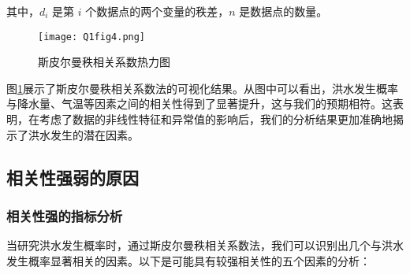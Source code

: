 \documentclass[withoutpreface,bwprint]{cumcmthesis} %
\begin{document}
其中，\(d_i\) 是第 \(i\) 个数据点的两个变量的秩差，\(n\) 是数据点的数量。

\begin{figure}[htbp]
	\centering
	\texttt{[image: Q1fig4.png]}
	\caption{斯皮尔曼秩相关系数热力图}\label{q1fig4}
\end{figure}

图\ref{q1fig4}展示了斯皮尔曼秩相关系数法的可视化结果。从图中可以看出，洪水发生概率与降水量、气温等因素之间的相关性得到了显著提升，这与我们的预期相符。这表明，在考虑了数据的非线性特征和异常值的影响后，我们的分析结果更加准确地揭示了洪水发生的潜在因素。

\subsection{相关性强弱的原因}
\subsubsection{相关性强的指标分析}
当研究洪水发生概率时，通过斯皮尔曼秩相关系数法，我们可以识别出几个与洪水发生概率显著相关的因素。以下是可能具有较强相关性的五个因素的分析：
\end{document}

